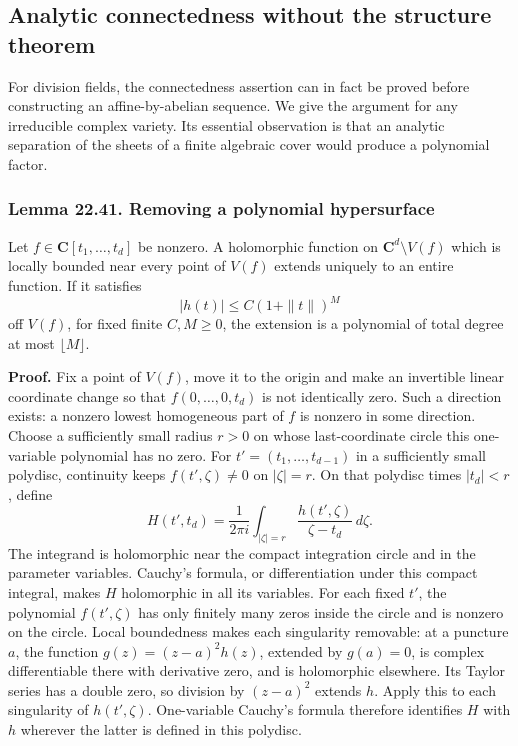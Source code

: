 \documentclass[
  11pt,
  a4paper,
]{article}
\begin{document}
\subsection{Analytic connectedness without the structure
theorem}\label{analytic-connectedness-without-the-structure-theorem}

For division fields, the connectedness assertion can in fact be proved
before constructing an affine-by-abelian sequence. We give the argument
for any irreducible complex variety. Its essential observation is that
an analytic separation of the sheets of a finite algebraic cover would
produce a polynomial factor.

\subsubsection{Lemma 22.41. Removing a polynomial
hypersurface}\label{lemma-22.41.-removing-a-polynomial-hypersurface}

Let \(f\in\mathbf C[t_1,\ldots,t_d]\) be nonzero. A holomorphic function
on \(\mathbf C^d\setminus V(f)\) which is locally bounded near every
point of \(V(f)\) extends uniquely to an entire function. If it
satisfies \[
 |h(t)|\le C(1+\|t\|)^M
 \tag{22.102}
\] off \(V(f)\), for fixed finite \(C,M\ge0\), the extension is a
polynomial of total degree at most \(\lfloor M\rfloor\).

\textbf{Proof.} Fix a point of \(V(f)\), move it to the origin and make
an invertible linear coordinate change so that \(f(0,\ldots,0,t_d)\) is
not identically zero. Such a direction exists: a nonzero lowest
homogeneous part of \(f\) is nonzero in some direction. Choose a
sufficiently small radius \(r>0\) on whose last-coordinate circle this
one-variable polynomial has no zero. For \(t'=(t_1,\ldots,t_{d-1})\) in
a sufficiently small polydisc, continuity keeps \(f(t',\zeta)\ne0\) on
\(|\zeta|=r\). On that polydisc times \(|t_d|<r\), define \[
 H(t',t_d)=\frac{1}{2\pi i}
       \int_{|\zeta|=r}\frac{h(t',\zeta)}{\zeta-t_d}\,d\zeta.
 \tag{22.103}
\] The integrand is holomorphic near the compact integration circle and
in the parameter variables. Cauchy's formula, or differentiation under
this compact integral, makes \(H\) holomorphic in all its variables. For
each fixed \(t'\), the polynomial \(f(t',\zeta)\) has only finitely many
zeros inside the circle and is nonzero on the circle. Local boundedness
makes each singularity removable: at a puncture \(a\), the function
\(g(z)=(z-a)^2h(z)\), extended by \(g(a)=0\), is complex differentiable
there with derivative zero, and is holomorphic elsewhere. Its Taylor
series has a double zero, so division by \((z-a)^2\) extends \(h\).
Apply this to each singularity of \(h(t',\zeta)\). One-variable Cauchy's
formula therefore identifies \(H\) with \(h\) wherever the latter is
defined in this polydisc.
\end{document}
